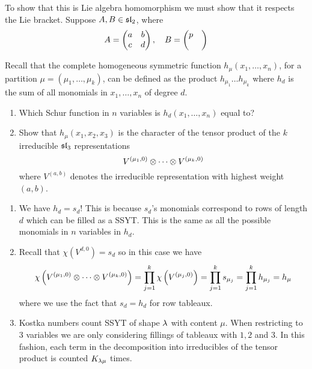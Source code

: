 \documentclass[12pt]{memoir}
\begin{document}
\begin{ptcbr}
    To show that this is Lie algebra homomorphism we must show that it respects the Lie bracket. Suppose $A,B\in\mathfrak{sl}_2$, where 
    $$A=\begin{pmatrix} a & b \\ c & d \end{pmatrix},\quad B=\begin{pmatrix} p &  \\  &  \end{pmatrix}$$
\end{ptcbr}
\begin{Ej}
    Recall that the complete homogeneous symmetric function $h_\mu(x_1,\dots,x_n)$, for a partition $\mu=(\mu_1,\dots,\mu_k)$,
can be deﬁned as the product $h_{\mu_1}\dots h_{\mu_k}$ where $h_d$ is the sum of all monomials in $x_1,\dots,x_n$ of degree $d$.
\begin{enumerate}
    \item Which Schur function in $n$ variables is $h_d(x_1,\dots,x_n) $ equal to?
    \item Show that $h_\mu(x_1, x_2, x_3)$ is the character of the tensor product of the $k$ irreducible $\mathfrak{sl}_3$ representations
    $$V^{(\mu_1,0)}\otimes\cdots\otimes V^{(\mu_k,0)}$$
    where $V^{(a,b)}$ denotes the irreducible representation with highest weight $(a, b)$.
\end{enumerate}
\end{Ej}

\begin{ptcbr}
    \begin{enumerate}
        \item We have $h_d=s_d$! This is because $s_d$'s monomials correspond to rows of length $d$ which can be filled as a SSYT. This is the same as all the possible monomials in $n$ variables in $h_d$.
        \item Recall that $\chi(V^{d,0})=s_d$ so in this case we have 
        $$\chi\left(V^{(\mu_1,0)}\otimes\cdots\otimes V^{(\mu_k,0)}\right)=\prod_{j=1}^{k}\chi\left(V^{(\mu_j,0)}\right)=\prod_{j=1}^{k}s_{\mu_j}=\prod_{j=1}^{k}h_{\mu_j}=h_\mu$$
        where we use the fact that $s_d=h_d$ for row tableaux.
        \item Kostka numbers count SSYT of shape $\lambda$ with content $\mu$. When restricting to 3 variables we are only considering fillings of tableaux with $1,2$ and $3$. In this fashion, each term in the decomposition into irreducibles of the tensor product is counted $K_{\lambda\mu}$ times.
    \end{enumerate}
\end{ptcbr}
\end{document}
